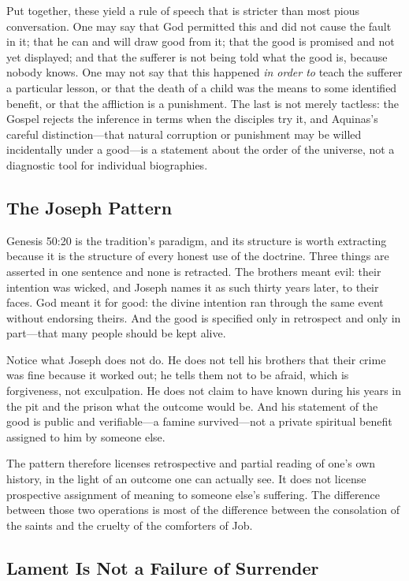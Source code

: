 Put together, these yield a rule of speech that is stricter than most pious conversation. One may say that God permitted this and did not cause the fault in it; that he can and will draw good from it; that the good is promised and not yet displayed; and that the sufferer is not being told what the good is, because nobody knows. One may not say that this happened \emph{in order to} teach the sufferer a particular lesson, or that the death of a child was the means to some identified benefit, or that the affliction is a punishment. The last is not merely tactless: the Gospel rejects the inference in terms when the disciples try it, and Aquinas's careful distinction---that natural corruption or punishment may be willed incidentally under a good---is a statement about the order of the universe, not a diagnostic tool for individual biographies.

\subsection{The Joseph Pattern}

Genesis 50:20 is the tradition's paradigm, and its structure is worth extracting because it is the structure of every honest use of the doctrine. Three things are asserted in one sentence and none is retracted. The brothers meant evil: their intention was wicked, and Joseph names it as such thirty years later, to their faces. God meant it for good: the divine intention ran through the same event without endorsing theirs. And the good is specified only in retrospect and only in part---that many people should be kept alive.

Notice what Joseph does not do. He does not tell his brothers that their crime was fine because it worked out; he tells them not to be afraid, which is forgiveness, not exculpation. He does not claim to have known during his years in the pit and the prison what the outcome would be. And his statement of the good is public and verifiable---a famine survived---not a private spiritual benefit assigned to him by someone else.

The pattern therefore licenses retrospective and partial reading of one's own history, in the light of an outcome one can actually see. It does not license prospective assignment of meaning to someone else's suffering. The difference between those two operations is most of the difference between the consolation of the saints and the cruelty of the comforters of Job.

\subsection{Lament Is Not a Failure of Surrender}

